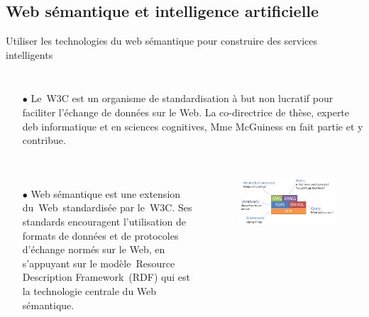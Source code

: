\documentclass[xcolor=dvipsnames]{beamer}
\begin{document}
\subsection{Web sémantique et intelligence artificielle}
\begin{frame}{Utiliser les technologies du web sémantique pour construire des services intelligents}
\begin{columns}
	\begin{itemize}
	\item[$\bullet$]Le W3C est un organisme de standardisation à but non lucratif pour faciliter l'échange de données sur le Web. La co-directrice de thèse, experte deb informatique et en sciences cognitives, Mme McGuiness en fait partie et y contribue.
	\end{itemize}
	\vspace{-0.5cm}
\end{columns}
	\begin{columns}
	\begin{itemize}
		\item[$\bullet$]Web sémantique est une extension du Web standardisée par le W3C. Ses standards encouragent l'utilisation de formats de données et de protocoles d'échange normés sur le Web, en s'appuyant sur le modèle Resource Description Framework (RDF) qui est la technologie centrale du Web sémantique. 
	\end{itemize}
	\begin{figure}[ht]
		\begin{center}
			\includegraphics[width=\textwidth]{./images/Semantic_Web.png}
		\end{center}
	\end{figure}
	\vspace{2.5cm}
\end{columns}
\end{frame}
\end{document}
